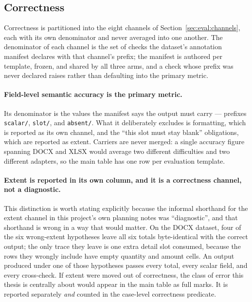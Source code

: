 \subsection{Correctness}

Correctness is partitioned into the eight channels of Section~\ref{sec:eval:channels}, each
with its own denominator and never averaged into one another. The denominator of each channel
is the set of checks the dataset's annotation manifest declares with that channel's prefix;
the manifest is authored per template, frozen, and shared by all three arms, and a check whose
prefix was never declared raises rather than defaulting into the primary metric.

\paragraph{Field-level semantic accuracy is the primary metric.}
Its denominator is the values the manifest says the output must carry --- prefixes
\texttt{scalar/}, \texttt{slot/}, and \texttt{absent/}. What it deliberately excludes is
formatting, which is reported as its own channel, and the ``this slot must stay blank''
obligations, which are reported as extent. Carriers are never merged: a single accuracy
figure spanning DOCX and XLSX would average two different difficulties and two different
adapters, so the main table has one row per evaluation template.

\paragraph{Extent is reported in its own column, and it is a correctness channel, not a
diagnostic.}
This distinction is worth stating explicitly because the informal shorthand for the extent
channel in this project's own planning notes was ``diagnostic'', and that shorthand is wrong
in a way that would matter. On the DOCX dataset, four of the six wrong-extent hypotheses
leave all six totals byte-identical with the correct output; the only trace they leave is one
extra detail slot consumed, because the rows they wrongly include have empty quantity and
amount cells. An output produced under one of those hypotheses passes every total, every
scalar field, and every cross-check. If extent were moved out of correctness, the class of
error this thesis is centrally about would appear in the main table as full marks. It is
reported separately \emph{and} counted in the case-level correctness predicate.

